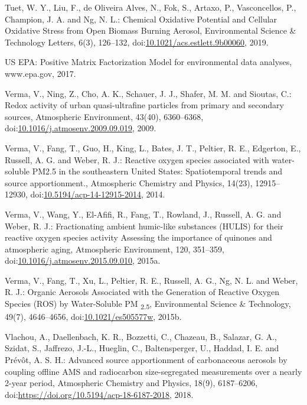 \documentclass[
]{article}
\begin{document}
Tuet, W. Y., Liu, F., de Oliveira Alves, N., Fok, S., Artaxo, P.,
Vasconcellos, P., Champion, J. A. and Ng, N. L.: Chemical Oxidative
Potential and Cellular Oxidative Stress from Open Biomass Burning
Aerosol, Environmental Science \& Technology Letters, 6(3), 126--132,
doi:\href{https://doi.org/10.1021/acs.estlett.9b00060}{10.1021/acs.estlett.9b00060},
2019.

US EPA: Positive Matrix Factorization Model for environmental data
analyses, www.epa.gov, 2017.

Verma, V., Ning, Z., Cho, A. K., Schauer, J. J., Shafer, M. M. and
Sioutas, C.: Redox activity of urban quasi-ultrafine particles from
primary and secondary sources, Atmospheric Environment, 43(40),
6360--6368,
doi:\href{https://doi.org/10.1016/j.atmosenv.2009.09.019}{10.1016/j.atmosenv.2009.09.019},
2009.

Verma, V., Fang, T., Guo, H., King, L., Bates, J. T., Peltier, R. E.,
Edgerton, E., Russell, A. G. and Weber, R. J.: Reactive oxygen species
associated with water-soluble PM2.5 in the southeastern United States:
Spatiotemporal trends and source apportionment., Atmospheric Chemistry
and Physics, 14(23), 12915--12930,
doi:\href{https://doi.org/10.5194/acp-14-12915-2014}{10.5194/acp-14-12915-2014},
2014.

Verma, V., Wang, Y., El-Afifi, R., Fang, T., Rowland, J., Russell, A. G.
and Weber, R. J.: Fractionating ambient humic-like substances (HULIS)
for their reactive oxygen species activity Assessing the importance of
quinones and atmospheric aging, Atmospheric Environment, 120, 351--359,
doi:\href{https://doi.org/10.1016/j.atmosenv.2015.09.010}{10.1016/j.atmosenv.2015.09.010},
2015a.

Verma, V., Fang, T., Xu, L., Peltier, R. E., Russell, A. G., Ng, N. L.
and Weber, R. J.: Organic Aerosols Associated with the Generation of
Reactive Oxygen Species (ROS) by Water-Soluble PM \textsubscript{2.5},
Environmental Science \& Technology, 49(7), 4646--4656,
doi:\href{https://doi.org/10.1021/es505577w}{10.1021/es505577w}, 2015b.

Vlachou, A., Daellenbach, K. R., Bozzetti, C., Chazeau, B., Salazar, G.
A., Szidat, S., Jaffrezo, J.-L., Hueglin, C., Baltensperger, U., Haddad,
I. E. and Prévôt, A. S. H.: Advanced source apportionment of
carbonaceous aerosols by coupling offline AMS and radiocarbon
size-segregated measurements over a nearly 2-year period, Atmospheric
Chemistry and Physics, 18(9), 6187--6206,
doi:\href{https://doi.org/https://doi.org/10.5194/acp-18-6187-2018}{https://doi.org/10.5194/acp-18-6187-2018},
2018.
\end{document}
